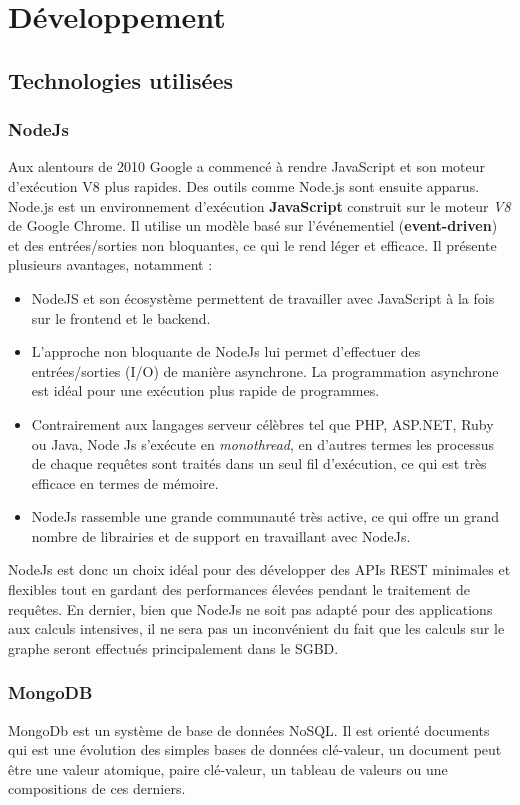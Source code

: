 \chapter{Développement}
\section{Technologies utilisées}
\subsection{NodeJs}
Aux alentours de 2010 Google a commencé à rendre JavaScript et son moteur d'exécution V8 plus rapides. Des outils comme Node.js sont ensuite apparus\cite{NodeJs}.\newline
Node.js est un environnement d'exécution \textbf{JavaScript} construit sur le moteur \emph{V8} de Google Chrome. Il utilise un modèle basé sur l'événementiel (\textbf{event-driven}) et des entrées/sorties non bloquantes, ce qui le rend léger et efficace.
Il présente plusieurs avantages, notamment :
\begin{itemize}
	\item NodeJS et son écosystème permettent de travailler avec JavaScript à la fois sur le frontend et le backend.
	\item L'approche non bloquante de NodeJs lui permet d'effectuer des entrées/sorties (I/O) de manière asynchrone. La programmation asynchrone est idéal pour une exécution plus rapide de programmes.
	\item Contrairement aux langages serveur célèbres tel que PHP, ASP.NET, Ruby ou Java, Node Js s'exécute en \emph{monothread}, en d'autres termes les processus de chaque requêtes sont traités dans un seul fil d'exécution, ce qui est très efficace en termes de mémoire.
	\item NodeJs rassemble une grande communauté très active, ce qui offre un grand nombre de librairies et de support en travaillant avec NodeJs.\newline
\end{itemize}
NodeJs est donc un choix idéal pour des développer des APIs REST minimales et flexibles tout en gardant des performances élevées pendant le traitement de requêtes.\newline
En dernier, bien que NodeJs ne soit pas adapté pour des applications aux calculs intensives, il ne sera pas un inconvénient du fait que les calculs sur le graphe seront effectués principalement dans le SGBD.

\subsection{MongoDB}
	MongoDb est un système de base de données NoSQL. Il est orienté documents qui est une évolution des simples bases de données clé-valeur, un document peut être une valeur atomique, paire clé-valeur, un tableau de valeurs ou une compositions de ces derniers.

